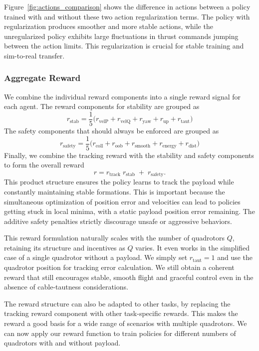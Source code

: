 Figure~\ref{fig:actions_comparison} shows the difference in actions between a policy trained with and without these two action regularization terms. The policy with regularization produces smoother and more stable actions, while the unregularized policy exhibits large fluctuations in thrust commands jumping between the action limits. This regularization is crucial for stable training and sim-to-real transfer.

\subsubsection{Aggregate Reward}
We combine the individual reward components into a single reward signal for each agent. The reward components for stability are grouped as
\begin{equation}
r_{\mathrm{stab}}
= \frac{1}{5}\bigl(r_{\mathrm{velP}} + r_{\mathrm{velQ}} + r_{\mathrm{yaw}} + r_{\mathrm{up}} + r_{\mathrm{taut}}\bigr)
\end{equation}
The safety components that should always be enforced are grouped as
\begin{equation}
r_{\mathrm{safety}}
= \frac{1}{5}\bigl(r_{\mathrm{coll}} + r_{\mathrm{oob}} + r_{\mathrm{smooth}} + r_{\mathrm{energy}} + r_{\mathrm{dist}}\bigr)
\end{equation}
Finally, we combine the tracking reward with the stability and safety components to form the overall reward
\begin{equation}
r
= r_{\mathrm{track}}\;r_{\mathrm{stab}}
\;+\;r_{\mathrm{safety}}.
\end{equation}
This product structure ensures the policy learns to track the payload while constantly maintaining stable formations. This is important because the simultaneous optimization of position error and velocities can lead to policies getting stuck in local minima, with a static payload position error remaining.
The additive safety penalties strictly discourage unsafe or aggressive behaviors.

This reward formulation naturally scales with the number of quadrotors \(Q\), retaining its structure and incentives as \(Q\) varies. It even works in the simplified case of a single quadrotor without a payload. We simply set \(r_{\mathrm{taut}}=1\) and use the quadrotor position for tracking error calculation. We still obtain a coherent reward that still encourages stable, smooth flight and graceful control even in the absence of cable-tautness considerations.

The reward structure can also be adapted to other tasks, by replacing the tracking reward component with other task-specific rewards. This makes the reward a good basis for a wide range of scenarios with multiple quadrotors. We can now apply our reward function to train policies for different numbers of quadrotors with and without payload.

